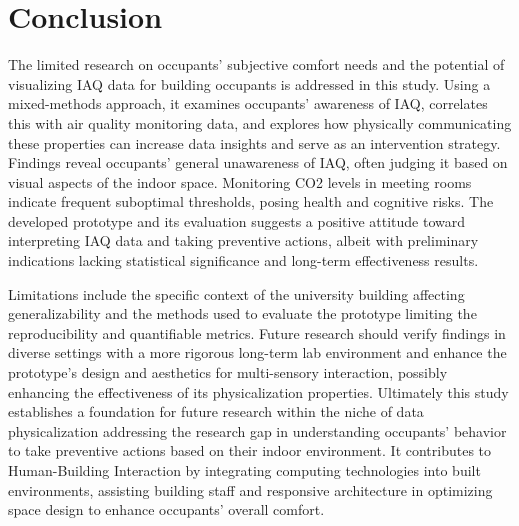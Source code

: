 \section{Conclusion}
\label{sec:conclusion}

The limited research on occupants' subjective comfort needs and the potential of visualizing IAQ data for building occupants is addressed in this study. Using a mixed-methods approach, it examines occupants' awareness of IAQ, correlates this with air quality monitoring data, and explores how physically communicating these properties can increase data insights and serve as an intervention strategy. Findings reveal occupants' general unawareness of IAQ, often judging it based on visual aspects of the indoor space. Monitoring CO2 levels in meeting rooms indicate frequent suboptimal thresholds, posing health and cognitive risks. The developed prototype and its evaluation suggests a positive attitude toward interpreting IAQ data and taking preventive actions, albeit with preliminary indications lacking statistical significance and long-term effectiveness results. 

Limitations include the specific context of the university building affecting generalizability and the methods used to evaluate the prototype limiting the reproducibility and quantifiable metrics. Future research should verify findings in diverse settings with a more rigorous long-term lab environment and enhance the prototype's design and aesthetics for multi-sensory interaction, possibly enhancing the effectiveness of its physicalization properties. Ultimately this study establishes a foundation for future research within the niche of data physicalization addressing the research gap in understanding occupants' behavior to take preventive actions based on their indoor environment.  It contributes to Human-Building Interaction by integrating computing technologies into built environments, assisting building staff and responsive architecture in optimizing space design to enhance occupants' overall comfort.

\newpage
